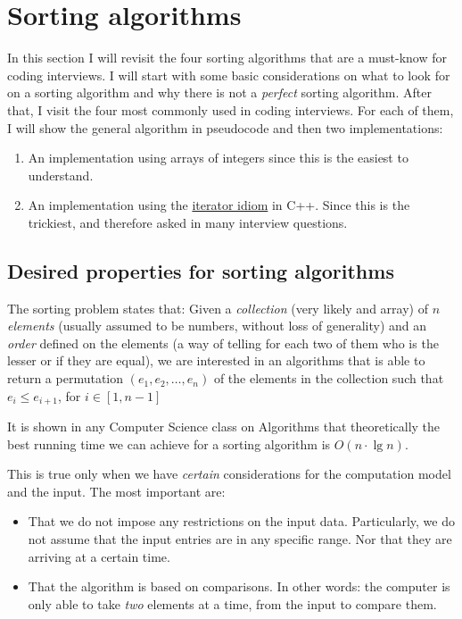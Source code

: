 \section{Sorting algorithms}

In this section I will revisit the four sorting algorithms that are a must-know for coding interviews.
I will start with some basic considerations on what to look for on a sorting algorithm and why there is not a \emph{perfect} sorting algorithm.
After that, I visit the four most commonly used in coding interviews.
For each of them, I will show the general algorithm in pseudocode and then two implementations:
\begin{enumerate}
 \item An implementation using arrays of integers since this is the easiest to understand.
 \item An implementation using the \href{https://en.wikibooks.org/wiki/More_C\%2B\%2B_Idioms/Iterator_Pair}{iterator idiom} in C++. Since this is the trickiest, and therefore asked in many interview questions.
\end{enumerate}

\subsection{Desired properties for sorting algorithms}

The sorting problem states that: Given a \emph{collection} (very likely and array) of $n$ \emph{elements} (usually assumed to be numbers, without loss of generality) and an \emph{order} defined on the elements (a way of telling for each two of them who is the lesser or if they are equal), we are interested in an algorithms that is able to return a permutation $(e_1, e_2, \ldots, e_n)$ of the elements in the collection such that $e_i \leq e_{i + 1}$, for $i \in [1, n-1]$

It is shown in any Computer Science class on Algorithms that theoretically the best running time we can achieve for a sorting algorithm is $O(n \cdot \lg n)$.

This is true only when we have \emph{certain} considerations for the computation model and the input. The most important are:

\begin{itemize}
 \item That we do not impose any restrictions on the input data. Particularly, we do not assume that the input entries are in any specific range. Nor that they are arriving at a certain time.
 \item That the algorithm is based on comparisons. In other words: the computer is only able to take \emph{two} elements at a time, from the input to compare them.
\end{itemize}

